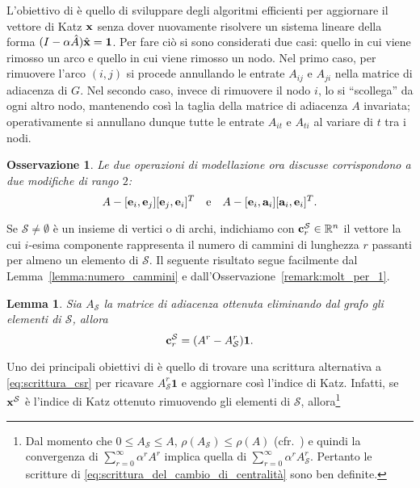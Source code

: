\documentclass[a4paper]{article}
\newcommand{\RR}{\mathbb{R}}
\newcommand{\evec}{{\bf e}}
\newcommand{\cvec}{{\bf c}}
\newcommand{\avec}{{\bf a}}
\newcommand{\xvec}{{\bf x}}
\newcommand{\bone}{\mathbf{1}}
\newcommand{\cS}{\mathcal{S}}
\newtheorem{lemma}{Lemma}
\newtheorem{remark}{Osservazione}
\begin{document}
L'obiettivo di \cite{katz2024} è quello di sviluppare degli algoritmi efficienti per aggiornare il vettore di Katz $\xvec$ senza dover nuovamente
risolvere un sistema lineare della forma $(I-\alpha \hat A)\hat\xvec = \bone$. Per fare ciò
si sono considerati due casi: quello in cui viene rimosso un arco e quello
in cui viene rimosso un nodo. Nel primo caso, per rimuovere l'arco $(i, j)$
si procede annullando le entrate $A_{ij}$ e $A_{ji}$ nella matrice di
adiacenza di $G$. Nel secondo caso, invece di rimuovere il nodo $i$, lo
si ``scollega'' da ogni altro nodo, mantenendo così la taglia della matrice
di adiacenza $A$ invariata; operativamente si annullano dunque tutte le
entrate $A_{it}$ e $A_{ti}$ al variare di $t$ tra i nodi.

\begin{remark} \label{remark:ops}
	Le due operazioni di modellazione ora discusse corrispondono a due modifiche di rango $2$:
	\[
		A - [\evec_i, \evec_j] [\evec_j, \evec_i]^T  \quad \text{e} \quad A - [\evec_i, \avec_i] [\avec_i, \evec_i]^T.
	\]
\end{remark}

Se $\cS \neq \emptyset$ è un insieme di vertici o di archi, indichiamo
con $\cvec^\cS_r \in \RR^n$ il vettore la cui $i$-esima componente
rappresenta il numero di cammini di lunghezza $r$ passanti per almeno
un elemento di $\cS$. Il seguente risultato segue facilmente dal Lemma~\ref{lemma:numero_cammini} e
dall'Osservazione~\ref{remark:molt_per_1}.

\begin{lemma}
	Sia $A_\cS$ la matrice di
	adiacenza ottenuta eliminando dal grafo gli elementi di $\cS$, allora
	\begin{equation} \label{eq:scrittura_csr}
		\cvec^\cS_r = (A^r - A_\cS^r)\bone.
	\end{equation}
\end{lemma}

Uno dei principali obiettivi di \cite{katz2024} è quello di trovare
una scrittura alternativa a \eqref{eq:scrittura_csr} per ricavare
$A_\cS^r \bone$ e aggiornare così l'indice di Katz. Infatti, se $\xvec^\cS$ è
l'indice di Katz ottenuto rimuovendo gli elementi di $\cS$, allora\footnote{Dal momento che $0 \leq A_\cS \leq A$, $\rho (A_\cS) \leq \rho(A)$ (cfr.~\cite{horn1985}) e quindi la convergenza di $\sum_{r=0}^\infty \alpha^r A^r$ implica
	quella di $\sum_{r=0}^\infty \alpha^r A_\cS^r$. Pertanto le scritture di \eqref{eq:scrittura_del_cambio_di_centralità} sono ben definite.}
\end{document}
